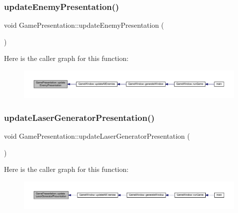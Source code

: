 \subsubsection{\texorpdfstring{update\+Enemy\+Presentation()}{updateEnemyPresentation()}}
{\footnotesize\ttfamily void Game\+Presentation\+::update\+Enemy\+Presentation (\begin{DoxyParamCaption}{ }\end{DoxyParamCaption})}

Here is the caller graph for this function\+:\nopagebreak
\begin{figure}[H]
\begin{center}
\leavevmode
\includegraphics[width=350pt]{class_game_presentation_a4ab96a6022c08f34aefa62f9a30c1cd8_icgraph}
\end{center}
\end{figure}
\mbox{\label{class_game_presentation_aa6d8e5e91de557ac2c39bb51e032f14f}} 
\subsubsection{\texorpdfstring{update\+Laser\+Generator\+Presentation()}{updateLaserGeneratorPresentation()}}
{\footnotesize\ttfamily void Game\+Presentation\+::update\+Laser\+Generator\+Presentation (\begin{DoxyParamCaption}{ }\end{DoxyParamCaption})}

Here is the caller graph for this function\+:\nopagebreak
\begin{figure}[H]
\begin{center}
\leavevmode
\includegraphics[width=350pt]{class_game_presentation_aa6d8e5e91de557ac2c39bb51e032f14f_icgraph}
\end{center}
\end{figure}
\mbox{\label{class_game_presentation_af0a19d50c4099e7a19426cdffa5ebb82}} 

